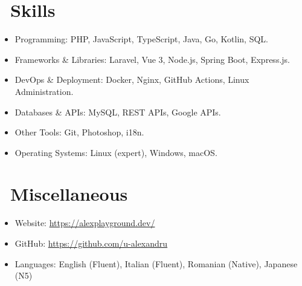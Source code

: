 \documentclass{resume}
\begin{document}
\vspace{1em}

\section{\faCogs\ Skills}
\begin{itemize}[parsep=0.5ex]
  \item Programming: PHP, JavaScript, TypeScript, Java, Go, Kotlin, SQL.
  \item Frameworks \& Libraries: Laravel, Vue 3, Node.js, Spring Boot, Express.js.
  \item DevOps \& Deployment: Docker, Nginx, GitHub Actions, Linux Administration.
  \item Databases \& APIs: MySQL, REST APIs, Google APIs.
  \item Other Tools: Git, Photoshop, i18n.
  \item Operating Systems: Linux (expert), Windows, macOS.
\end{itemize}

\vspace{1em}

\section{\faInfo\ Miscellaneous}
\begin{itemize}[parsep=0.5ex]
  \item Website: \url{https://alexplayground.dev/}
  \item GitHub: \url{https://github.com/u-alexandru}
  \item Languages: English (Fluent), Italian (Fluent), Romanian (Native), Japanese (N5)
\end{itemize}
\end{document}
